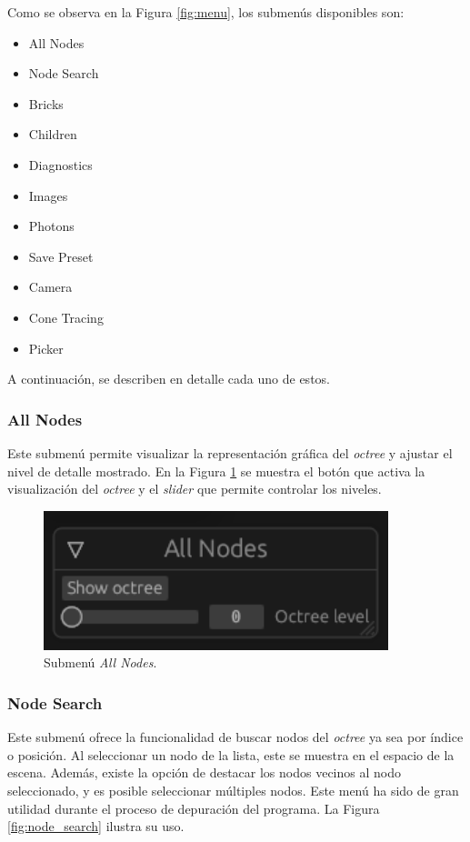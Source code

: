 Como se observa en la Figura \ref{fig:menu}, los submenús disponibles son:

\begin{itemize}
	\item All Nodes
	\item Node Search
	\item Bricks
	\item Children
	\item Diagnostics
	\item Images
	\item Photons
	\item Save Preset
	\item Camera
	\item Cone Tracing
	\item Picker
\end{itemize}

A continuación, se describen en detalle cada uno de estos.

\subsubsection{All Nodes}

Este submenú permite visualizar la representación gráfica del \textit{octree} y ajustar el nivel de detalle mostrado. En la Figura \ref{fig:all_nodes} se muestra el botón que activa la visualización del \textit{octree} y el \textit{slider} que permite controlar los niveles.

\begin{figure}[h]
    \centering
    \includegraphics[width=.5\textwidth]{all_nodes.png}
    \caption{Submenú \textit{All Nodes}.}
    \label{fig:all_nodes}
\end{figure}

\subsubsection{Node Search}

Este submenú ofrece la funcionalidad de buscar nodos del \textit{octree} ya sea por índice o posición. Al seleccionar un nodo de la lista, este se muestra en el espacio de la escena. Además, existe la opción de destacar los nodos vecinos al nodo seleccionado, y es posible seleccionar múltiples nodos. Este menú ha sido de gran utilidad durante el proceso de depuración del programa. La Figura \ref{fig:node_search} ilustra su uso.

